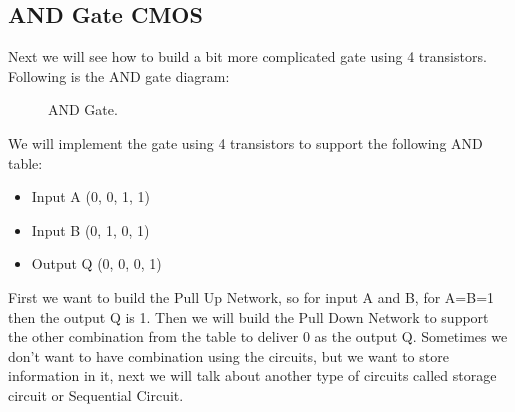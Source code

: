 \subsection{ AND Gate CMOS}
Next we will see how to build a bit more complicated gate using 4 transistors. Following is the AND gate diagram:
\begin{figure}
    \centering
    
    \caption{AND Gate.} \label{fig:and}
\end{figure}

We will implement the gate using 4 transistors to support the following AND table:
\begin{itemize}
\item Input A (0, 0, 1, 1)
\item Input B (0, 1, 0, 1)
    	\item Output Q (0, 0, 0, 1)
\end{itemize}

First we want to build the Pull Up Network, so for input A and B, for A=B=1 then the output Q is 1.
Then we will build the Pull Down Network to support the other combination from the table to deliver 0 as the output Q.
Sometimes we don’t want to have combination using the circuits, but we want to store information in it, next we will talk about another type of circuits called storage circuit or Sequential Circuit.
